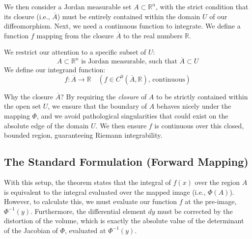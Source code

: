 \begin{spoken-clean}[00:01:29 - 00:02:45]
We then consider a Jordan measurable set $A \subset \mathbb{R}^n$, with the strict condition that its closure (i.e., $\overline{A}$) must be entirely contained within the domain $U$ of our diffeomorphism. Next, we need a continuous function to integrate. We define a function $f$ mapping from the closure $\overline{A}$ to the real numbers $\mathbb{R}$.
\end{spoken-clean}

\begin{math-stroke}
We restrict our attention to a specific subset of $U$:
\[
A \subset \mathbb{R}^n \text{ is Jordan measurable, such that } \overline{A} \subset U
\]
We define our integrand function:
\[
f: \overline{A} \to \mathbb{R} \quad (f \in C^0(\overline{A}, \mathbb{R})\text{, continuous})
\]


\end{math-stroke}

\begin{didactic-insight}
Why the closure $\overline{A}$? By requiring the \textit{closure} of $A$ to be strictly contained within the open set $U$, we ensure that the boundary of $A$ behaves nicely under the mapping $\Phi$, and we avoid pathological singularities that could exist on the absolute edge of the domain $U$. We then ensure $f$ is continuous over this closed, bounded region, guaranteeing Riemann integrability.
\end{didactic-insight}
\subsection{The Standard Formulation (Forward Mapping)}

\begin{spoken-clean}[00:02:45 - 00:03:50]
With this setup, the theorem states that the integral of $f(x)$ over the region $A$ is equivalent to the integral evaluated over the mapped image (i.e., $\Phi(A)$). However, to calculate this, we must evaluate our function $f$ at the pre-image, $\Phi^{-1}(y)$. Furthermore, the differential element $dy$ must be corrected by the distortion of the volume, which is exactly the absolute value of the determinant of the Jacobian of $\Phi$, evaluated at $\Phi^{-1}(y)$.
\end{spoken-clean}

